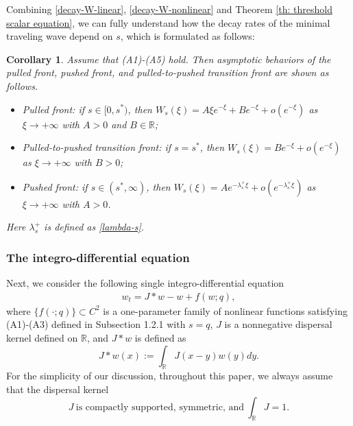 \documentclass[11pt,a4paper]{article}
\newtheorem{corollary}[theorem]{\textbf{Corollary}}
\newtheorem{remark}[theorem]{\textbf{Remark}}
\numberwithin{equation}{section}
\numberwithin{figure}{section}
\newcommand\bea{\begin{eqnarray}}
\newcommand\eea{\end{eqnarray}}
\newcommand\beaa{\begin{eqnarray*}}
\newcommand\eeaa{\end{eqnarray*}}
\begin{document}
Combining \eqref{decay-W-linear}, \eqref{decay-W-nonlinear} and Theorem \ref{th: threshold scalar equation},
we can fully understand how the decay rates of the minimal traveling wave depend on $s$, which is formulated as follows:

\begin{corollary}\label{cor: different minimal tw}
Assume that (A1)-(A5) hold. Then asymptotic behaviors of the pulled front, pushed front, and pulled-to-pushed transition front are shown as follows.
\begin{itemize}
    \item[(1)] Pulled front: if $s\in[0,s^*)$, then $W_s(\xi)=A\xi e^{-\xi}+Be^{-\xi}+o(e^{-\xi})$ as $\xi\to+\infty$ with $A>0$ and $B\in \mathbb{R}$;
    \item[(2)] Pulled-to-pushed transition front: if $s=s^*$, then $W_s(\xi)=Be^{-\xi}+o(e^{-\xi})$ as $\xi\to+\infty$ with $B>0$;
    \item[(3)] Pushed front: if $s\in(s^*,\infty)$, then $W_s(\xi)=Ae^{-\lambda_s^+\xi}+o(e^{-\lambda_s^+\xi})$ as $\xi\to+\infty$ with $A>0$.%
\end{itemize}
Here $\lambda_{s}^+$ is defined as \eqref{lambda-s}.
\end{corollary}

\subsubsection{The integro-differential equation}\label{sec: intro nonlocal}

\noindent

Next, we  consider the following single integro-differential equation
\bea\label{nonlocal equation}
w_t= J\ast w-w +f(w;q),
\eea
where
$\{f(\cdot;q)\}\subset C^2$ is a one-parameter family of nonlinear functions satisfying (A1)-(A3) defined in Subsection 1.2.1 with $s=q$, %
$J$ is a nonnegative dispersal kernel defined on $\mathbb{R}$, and $J\ast w$ is defined as
$$J\ast w(x):=\int_{\mathbb{R}}J(x-y)w(y)dy.$$ %
For the simplicity of our discussion, throughout this paper, we always assume that the dispersal kernel
\begin{equation}\label{assumption on J}
J\ \text{is compactly supported, symmetric, and}\ \int_{\mathbb{R}}J=1.
\end{equation}
\end{document}
